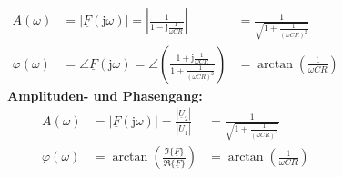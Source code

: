 \begin{frame}
\begin{columns}
{                \begin{align}
                    A(\omega)       &= |\underline{F}(\mathrm{j}\omega)| = \left|\frac{1}{1-\mathrm{j}\frac{1}{\omega CR}}\right|
                                    &= \frac{1}{\sqrt{1 + \frac{1}{(\omega CR)^2}}} \label{eq:hochpass:ampli}\\
                    \varphi(\omega) &= \angle \underline{F}(\mathrm{j}\omega) = \angle\left(\frac{1 + \mathrm{j}\frac{1}{\omega CR}}{1 + \frac{1}{(\omega CR)^2}}\right)
                                    &= \arctan\left(\frac{1}{\omega CR}\right)\label{eq:hochpass:phase}
                \end{align}
            }%
            \b{%
                \textbf{Amplituden- und Phasengang:}
                \begin{align*} %
                    A(\omega)       &= |\underline{F}(\mathrm{j}\omega)| = \frac{|\underline{U}_2|}{|\underline{U}_1|}
                                    &= \frac{1}{\sqrt{1 + \frac{1}{(\omega CR)^2}}} \\
                    \varphi(\omega) &= \arctan\left(\frac{\Im\{\underline{F}\}}{\Re\{\underline{F}\}}\right)
                                    &= \arctan\left(\frac{1}{\omega CR}\right)\\
                \end{align*}
            }%
    \end{columns}
\end{frame}


